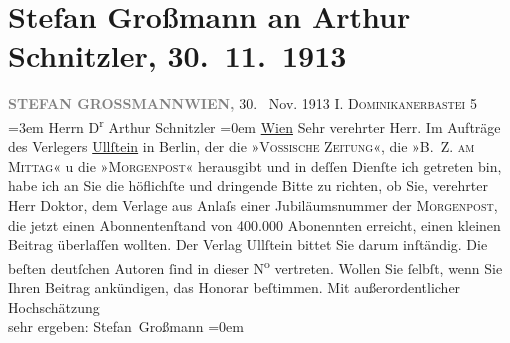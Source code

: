 

         
         \renewcommand{\erwaehntePersonen}{Personen: Stefan Großmann}
         \renewcommand{\erwaehnteInstitutionen}{Institutionen: B.Z. am Mittag, Berliner Morgenpost, Ullstein Verlag, Vossische Zeitung}
         \renewcommand{\erwaehnteOrte}{Orte: Berlin, Dominikanerbastei, Wien}
         \renewcommand{\erwaehnteWerke}{}
               \section[Stefan Großmann an Arthur Schnitzler, 30. 11. 1913]{ Stefan Großmann an Arthur Schnitzler, 30. 11. 1913}\nopagebreak{}\rehead{ }\begin{ledgroupsized}[t]{13cm}\normalsize\beginnumbering{} \toendnotes[C]{\smallbreak\pagebreak[2]} 
\pstart
           \noindent{}{\pb}\textcolor{gray}{\textbf{STEFAN GROSSMANN}}\hfill \textcolor{gray}{\textbf{WIEN,}}{ }30.  Nov. 1913\pend
           \pstart
           \raggedleft{}I. \textsc{Dominikanerbastei}
                     5\pend
           \leftskip=3em{}\pstart
           \noindent{}Herrn D\textsuperscript{r} Arthur Schnitzler\pend
           \leftskip=0em{}\pstart
           \noindent{}\raggedleft{}\uline{Wien}\pend
           \pstart{}Sehr verehrter Herr.\pend\pstart
           Im Aufträge des Verlegers \uline{Ullſtein} in Berlin, der die »\textsc{Vossische Zeitung}«, die »\textsc{B. Z. am Mittag}« u die »\textsc{Morgenpost}« herausgibt und in deſſen Dienſte ich getreten bin, habe ich an Sie die
               höflichſte und dringende Bitte zu richten, ob Sie, verehrter Herr Doktor, dem Verlage
               aus Anlaſs einer Jubiläumsnummer der \textsc{Morgenpost}, die jetzt einen Abonnentenſtand von 400.000 Abonennten erreicht, einen kleinen
               Beitrag überlaſſen wollten.\pend
           \pstart
           Der Verlag Ullſtein bittet Sie darum inſtändig.
               Die beſten deutſchen Autoren ſind in dieser N\textsuperscript{o} vertreten.
               Wollen Sie ſelbſt, wenn Sie Ihren Beitrag ankündigen, das Honorar beſtimmen.\pend
           \pstart
           Mit außerordentlicher Hochschätzung{\\[\baselineskip]}sehr ergeben: \spacefill\mbox{Stefan
                  Großmann}\pend
           \leftskip=0em{}
         

\end{ledgroupsized}

